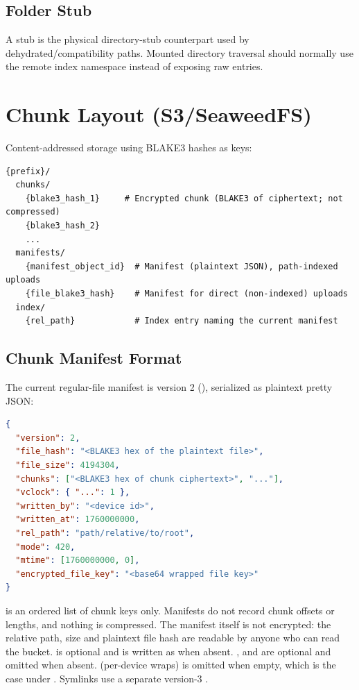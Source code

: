 \documentclass[11pt,a4paper]{article}
\begin{document}
\subsection{ Folder Stub}

A  stub is the physical directory-stub counterpart used by
dehydrated/compatibility paths. Mounted directory traversal should normally use
the remote index namespace instead of exposing raw  entries.

\section{Chunk Layout (S3/SeaweedFS)}

Content-addressed storage using BLAKE3 hashes as keys:

\begin{lstlisting}
{prefix}/
  chunks/
    {blake3_hash_1}     # Encrypted chunk (BLAKE3 of ciphertext; not compressed)
    {blake3_hash_2}
    ...
  manifests/
    {manifest_object_id}  # Manifest (plaintext JSON), path-indexed uploads
    {file_blake3_hash}    # Manifest for direct (non-indexed) uploads
  index/
    {rel_path}            # Index entry naming the current manifest
\end{lstlisting}

\subsection{Chunk Manifest Format}

The current regular-file manifest is  version 2
(), serialized as plaintext pretty
JSON:

\begin{lstlisting}[language=json]
{
  "version": 2,
  "file_hash": "<BLAKE3 hex of the plaintext file>",
  "file_size": 4194304,
  "chunks": ["<BLAKE3 hex of chunk ciphertext>", "..."],
  "vclock": { "...": 1 },
  "written_by": "<device id>",
  "written_at": 1760000000,
  "rel_path": "path/relative/to/root",
  "mode": 420,
  "mtime": [1760000000, 0],
  "encrypted_file_key": "<base64 wrapped file key>"
}
\end{lstlisting}

 is an ordered list of chunk keys only. Manifests do not record
chunk offsets or lengths, and nothing is compressed. The manifest itself is
not encrypted: the relative path, size and plaintext file hash are readable
by anyone who can read the bucket.  is optional and is
written as  when absent. ,  and
 are optional and omitted when absent.
 (per-device wraps) is omitted when empty, which
is the case under .
Symlinks use a separate version-3 .
\end{document}
